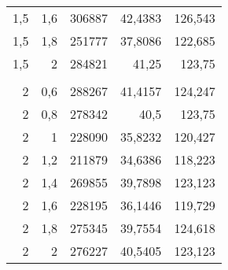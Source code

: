 \begin{table}[htbp]
\begin{tabular}{rrrrr}
    1,5   & 1,6   & 306887 & 42,4383 & 126,543 \\
    1,5   & 1,8   & 251777 & 37,8086 & 122,685 \\
    1,5   & 2     & 284821 & 41,25 & 123,75 \\
          &       &       &       &  \\
    2     & 0,6   & 288267 & 41,4157 & 124,247 \\
    2     & 0,8   & 278342 & 40,5  & 123,75 \\
    2     & 1     & 228090 & 35,8232 & 120,427 \\
    2     & 1,2   & 211879 & 34,6386 & 118,223 \\
    2     & 1,4   & 269855 & 39,7898 & 123,123 \\
    2     & 1,6   & 228195 & 36,1446 & 119,729 \\
    2     & 1,8   & 275345 & 39,7554 & 124,618 \\
    2     & 2     & 276227 & 40,5405 & 123,123 \\
    \bottomrule
    \end{tabular}%
  \label{tab:test2}%
\end{table}%

